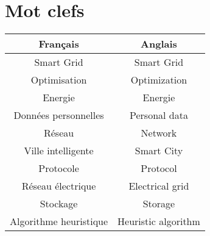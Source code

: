 \chapter*{Mot clefs}

\begin{center}
    \begin{tabular}{ |c|c| }
        \hline
        Français & Anglais \\
        \hline
        Smart Grid & Smart Grid \\
        Optimisation & Optimization \\
        Energie & Energie \\
        Données personnelles & Personal data \\
        Réseau & Network \\
        Ville intelligente & Smart City \\
        Protocole & Protocol \\
        Réseau électrique & Electrical grid \\
        Stockage & Storage \\
        Algorithme heuristique & Heuristic algorithm \\
        \hline
    \end{tabular}
\end{center}
